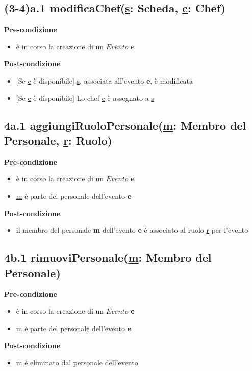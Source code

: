 \documentclass[12pt]{extarticle}
\begin{document}
\subsection*{(3-4)a.1 modificaChef(\underline{s}: Scheda, \underline{c}: Chef)}
\textbf{Pre-condizione}
\begin{itemize}
  \item è in corso la creazione di un $Evento$ \textbf{e}
\end{itemize} 
\textbf{Post-condizione}
\begin{itemize}
  \item $[$Se \underline{c}  è disponibile$]$ \underline{s}, associata all'evento \textbf{e}, è modificata
  \item $[$Se \underline{c}  è disponibile$]$ Lo chef \underline{c}  è assegnato a \underline{s}
\end{itemize}


\subsection*{4a.1 aggiungiRuoloPersonale(\underline{m}: Membro del Personale, \underline{r}: Ruolo)}
\textbf{Pre-condizione}
\begin{itemize}
  \item è in corso la creazione di un $Evento$ \textbf{e}
  \item \underline{m} è parte del personale dell'evento \textbf{e}
\end{itemize}
\textbf{Post-condizione}
\begin{itemize}
  \item il membro del personale \textbf{m} dell'evento \textbf{e} è associato al ruolo \underline{r} per l'evento
\end{itemize}


\subsection*{4b.1 rimuoviPersonale(\underline{m}: Membro del Personale)}
\textbf{Pre-condizione}
\begin{itemize}
  \item è in corso la creazione di un $Evento$ \textbf{e}
  \item \underline{m} è parte del personale dell'evento \textbf{e}
\end{itemize}
\textbf{Post-condizione}
\begin{itemize}
  \item \underline{m} è eliminato dal personale dell'evento
\end{itemize}
\end{document}
